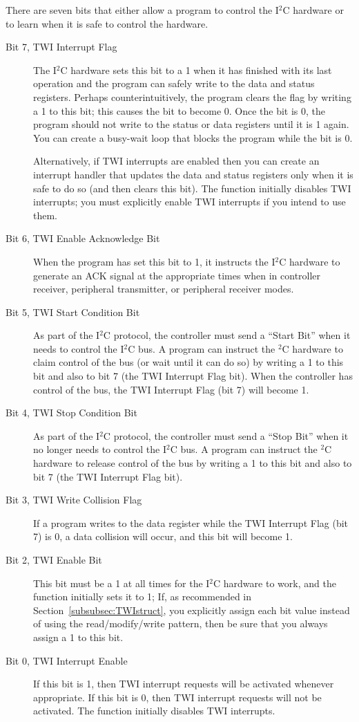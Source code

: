 There are seven bits that either allow a program to control the I$^2$C hardware or to learn when it is safe to control the hardware.
\begin{description}
    \item[Bit 7, TWI Interrupt Flag] The I$^2$C hardware sets this bit to a 1 when it has finished with its last operation and the program can safely write to the data and status registers.
        Perhaps counterintuitively, the program clears the flag by writing a 1 to this bit;
        this causes the bit to become 0.
        Once the bit is 0, the program should not write to the status or data registers until it is 1 again.
        You can create a busy-wait loop that blocks the program while the bit is 0.

        Alternatively, if TWI interrupts are enabled then you can create an interrupt handler that updates the data and status registers only when it is safe to do so (and then clears this bit).
        The  function initially disables TWI interrupts;
        you must explicitly enable TWI interrupts if you intend to use them.
    \item[Bit 6, TWI Enable Acknowledge Bit] When the program has set this bit to 1, it instructs the I$^2$C hardware to generate an ACK signal at the appropriate times when in controller receiver, peripheral transmitter, or peripheral receiver modes.
    \item[Bit 5, TWI Start Condition Bit] As part of the I$^2$C protocol, the controller must send a ``Start Bit'' when it needs to control the I$^2$C bus.
        A program can instruct the $^2$C hardware to claim control of the bus (or wait until it can do so) by writing a 1 to this bit and also to bit 7 (the TWI Interrupt Flag bit).
        When the controller has control of the bus, the TWI Interrupt Flag (bit 7) will become 1.
    \item[Bit 4, TWI Stop Condition Bit] As part of the I$^2$C protocol, the controller must send a ``Stop Bit'' when it no longer needs to control the I$^2$C bus.
        A program can instruct the $^2$C hardware to release control of the bus by writing a 1 to this bit and also to bit 7 (the TWI Interrupt Flag bit).
    \item[Bit 3, TWI Write Collision Flag] If a program writes to the data register while the TWI Interrupt Flag (bit 7) is 0, a data collision will occur, and this bit will become 1.
    \item[Bit 2, TWI Enable Bit] This bit must be a 1 at all times for the I$^2$C hardware to work, and the  function initially sets it to 1;
        If, as recommended in Section~\ref{subsubsec:TWIstruct}, you explicitly assign each bit value instead of using the read/modify/write pattern, then be sure that you always assign a 1 to this bit.
    \item[Bit 0, TWI Interrupt Enable] If this bit is 1, then TWI interrupt requests will be activated whenever appropriate.
        If this bit is 0, then TWI interrupt requests will not be activated.
        The  function initially disables TWI interrupts.
\end{description}

